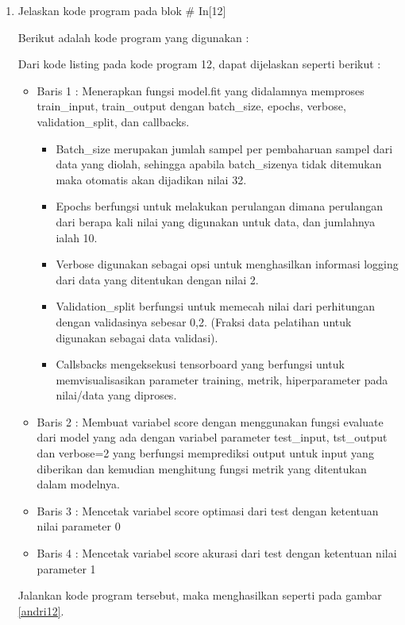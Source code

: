 \begin{enumerate}
\item Jelaskan kode program pada blok \# In[12]
	\par Berikut adalah kode program yang digunakan :
	
	\par Dari kode listing pada kode program 12, dapat dijelaskan seperti berikut :
	\begin{itemize}
	\item Baris 1	: Menerapkan fungsi model.fit yang didalamnya memproses train\_input, train\_output dengan batch\_size, epochs, verbose, validation\_split, dan callbacks.
		\begin{itemize}
		\item Batch\_size merupakan jumlah sampel per pembaharuan sampel dari data yang diolah, sehingga apabila batch\_sizenya tidak ditemukan maka otomatis akan dijadikan nilai 32.
		\item Epochs berfungsi untuk melakukan perulangan dimana perulangan dari berapa kali nilai yang digunakan untuk data, dan jumlahnya ialah 10.
		\item Verbose digunakan sebagai opsi untuk menghasilkan informasi logging dari data yang ditentukan dengan nilai 2.
		\item Validation\_split berfungsi untuk memecah nilai dari perhitungan dengan validasinya sebesar 0,2. (Fraksi data pelatihan untuk digunakan sebagai data validasi).
		\item Callsbacks mengeksekusi tensorboard yang berfungsi untuk memvisualisasikan parameter training, metrik, hiperparameter pada nilai/data yang diproses.
		\end{itemize}	
	\item Baris 2	: Membuat variabel score dengan menggunakan fungsi evaluate dari model yang ada dengan variabel parameter test\_input, tst\_output dan verbose=2 yang berfungsi memprediksi output untuk input yang diberikan dan kemudian menghitung fungsi metrik yang ditentukan dalam modelnya.
	\item Baris 3	: Mencetak variabel score optimasi dari test dengan ketentuan nilai parameter 0
	\item Baris 4	: Mencetak variabel score akurasi dari test dengan ketentuan nilai parameter 1
	\end{itemize}
	\par Jalankan kode program tersebut, maka menghasilkan seperti pada gambar \ref{andri12}.
		\begin{figure}[!hbtp]

\end{figure}
\end{enumerate}
